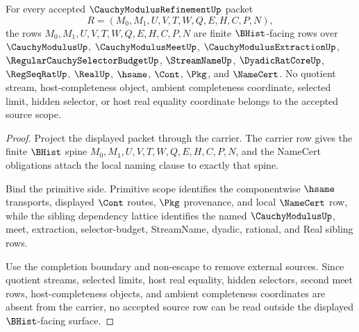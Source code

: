 \begin{theorem}
\label{thm:cauchy-modulus-refinement-bhist-source-scope}
For every accepted $\CauchyModulusRefinementUp$ packet
$$
R=(M_0,M_1,U,V,T,W,Q,E,H,C,P,N),
$$
the rows $M_0,M_1,U,V,T,W,Q,E,H,C,P,N$ are finite $\BHist$-facing rows over $\CauchyModulusUp$, $\CauchyModulusMeetUp$, $\CauchyModulusExtractionUp$, $\RegularCauchySelectorBudgetUp$, $\StreamNameUp$, $\DyadicRatCoreUp$, $\RegSeqRatUp$, $\RealUp$, $\hsame$, $\Cont$, $\Pkg$, and $\NameCert$. No quotient stream, host-completeness object, ambient completeness coordinate, selected limit, hidden selector, or host real equality coordinate belongs to the accepted source scope.
\end{theorem}
\begin{proof}
Project the displayed packet through the carrier. The carrier row gives the finite $\BHist$ spine $M_0,M_1,U,V,T,W,Q,E,H,C,P,N$, and the NameCert obligations attach the local naming clause to exactly that spine.

Bind the primitive side. Primitive scope identifies the componentwise $\hsame$ transports, displayed $\Cont$ routes, $\Pkg$ provenance, and local $\NameCert$ row, while the sibling dependency lattice identifies the named $\CauchyModulusUp$, meet, extraction, selector-budget, StreamName, dyadic, rational, and Real sibling rows.

Use the completion boundary and non-escape to remove external sources. Since quotient streams, selected limits, host real equality, hidden selectors, second meet rows, host-completeness objects, and ambient completeness coordinates are absent from the carrier, no accepted source row can be read outside the displayed $\BHist$-facing surface.
\end{proof}


